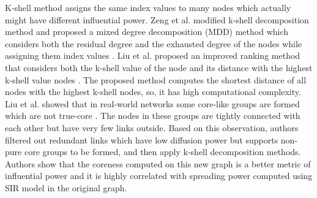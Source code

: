\documentclass[12pt,3p]{article}
\begin{document}
K-shell method assigns the same index values to many nodes which actually might have different influential power. Zeng et al. modified k-shell decomposition method and proposed a mixed degree decomposition (MDD) method which considers both the residual degree and the exhausted degree of the nodes while assigning them index values \cite{zeng2013ranking}. Liu et al. proposed an improved ranking method that considers both the k-shell value of the node and its distance with the highest k-shell value nodes \cite{liu2013ranking}. The proposed method computes the shortest distance of all nodes with the highest k-shell nodes, so, it has high computational complexity. Liu et al. showed that in real-world networks some core-like groups are formed which are not true-core \cite{liu2015improving}. The nodes in these groups are tightly connected with each other but have very few links outside. Based on this observation, authors filtered out redundant links which have low diffusion power but supports non-pure core groups to be formed, and then apply k-shell decomposition methods. Authors show that the coreness computed on this new graph is a better metric of influential power and it is highly correlated with spreading power computed using SIR model in the original graph. 
\end{document}
